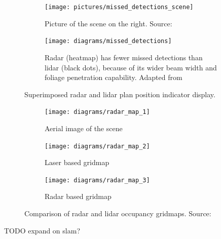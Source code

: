 \begin{figure}[htbp]
    \centering
    \begin{subfigure}[t]{0.45\textwidth}
        \texttt{[image: pictures/missed\_detections\_scene]}
        \caption{Picture of the scene on the right. Source: \cite{Jose2010}}
        \label{fig:missed_detections_scene}
    \end{subfigure}
    \hfill
    \begin{subfigure}[t]{0.45\textwidth}
        \texttt{[image: diagrams/missed\_detections]}
        \caption{Radar (heatmap) has fewer missed detections than lidar (black dots), because of its wider beam width and foliage penetration capability. Adapted from \cite{Adams2015}}
        \label{fig:missed_detections}
    \end{subfigure}
    \caption{Superimposed radar and lidar plan position indicator display.}
\end{figure}
\begin{figure}[htbp]
    \centering
    \begin{subfigure}[t]{0.32\textwidth}
        \texttt{[image: diagrams/radar\_map\_1]}
        \caption{Aerial image of the scene}
        \label{fig:radar_map_1}
    \end{subfigure}
    \hfill
    \begin{subfigure}[t]{0.32\textwidth}
        \texttt{[image: diagrams/radar\_map\_2]}
        \caption{Laser based gridmap}
        \label{fig:radar_map_2}
    \end{subfigure}
    \hfill
    \begin{subfigure}[t]{0.32\textwidth}
        \texttt{[image: diagrams/radar\_map\_3]}
        \caption{Radar based gridmap}
        \label{fig:radar_map_3}
    \end{subfigure}
    \caption{Comparison of radar and lidar occupancy gridmaps. Source: \cite{Adams2015}}
    \label{fig:radar_map}
\end{figure}

TODO expand on slam?
